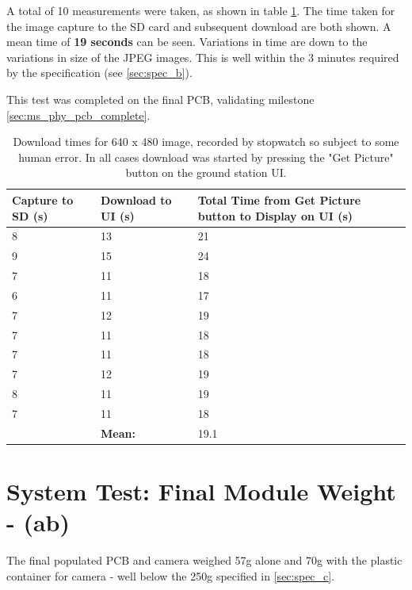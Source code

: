A total of 10 measurements were taken, as shown in table \ref{table:download_time_test}.
The time taken for the image capture to the SD card and subsequent download are both
shown. A mean time of \textbf{19 seconds} can be seen. Variations in time are down to the
variations in size of the JPEG images. This is well within the 3 minutes required by the specification (see \ref{sec:spec_b}).

This test was completed on the final PCB, validating milestone \ref{sec:ms_phy_pcb_complete}.

\begin{table}[!hbtp]

	\centering
	\begin{tabular}{ | p{3cm} | p{3cm} | p{4cm} | }
	\hline
	\textbf{Capture to SD (s)} & \textbf{Download to UI (s)} & 
	\textbf{Total Time from Get Picture button to Display on UI (s)} \\ \hline

	8 & 13  & 21 \\ \hline
	9 & 15  & 24 \\ \hline
	7 & 11  & 18 \\ \hline
	6 & 11  & 17 \\ \hline
	7 & 12  & 19 \\ \hline
	7 & 11  & 18 \\ \hline
	7 & 11  & 18 \\ \hline
	7 & 12  & 19 \\ \hline
	8 & 11  & 19 \\ \hline
	7 & 11  & 18 \\ \hline
	 & \textbf{Mean:} & 19.1 \\ \hline

	\end{tabular}
	\caption{Download times for 640 x 480 image, recorded by stopwatch so subject to some human error. In all cases download was started by pressing the "Get Picture" button on the ground station UI.}
	\label{table:download_time_test}
\end{table}

\section{System Test: Final Module Weight - (ab)}
The final populated PCB and camera weighed 57g alone and 70g with the plastic container for 
camera - well below the 250g specified in \ref{sec:spec_c}.



